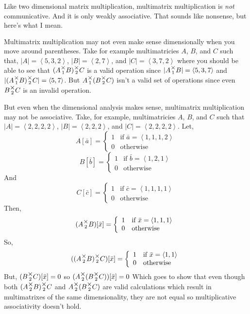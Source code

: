 \documentclass[12pt]{article}
\theoremstyle{definition}
\theoremstyle{case}
\theoremstyle{ppart}
\newcommand{\mmult}[1]{\text{\raisebox{1ex}{$\underset{#1}{\times}$}}}
\begin{document}
Like two dimensional matrix multiplication, multimatrix multiplication is
\textit{not} communicative. And it is only weakly associative. That sounds like
nonsense, but here's what I mean.

Multimatrix multiplication may not even make sense dimensionally when you move
around parentheses. Take for example multimatricies $A$, $B$, and $C$ such that,
$|A| = \left<5,3,2\right>$,
$|B| = \left<2,7\right>$, and
$|C| = \left<3,7,2\right>$ where you should be able to see that
$(A \mmult{1} B) \mmult{2} C$ is a valid operation since
$|A \mmult{1} B| = \left<5,3,7\right>$ and
$|(A \mmult{1} B) \mmult{2} C| = \left<5,7\right>$. But
$A \mmult{1} (B \mmult{2} C)$ isn't a valid set of operations since even
$B \mmult{2} C$ is an invalid operation.

But even when the dimensional analysis makes sense, multimatrix multiplication
may not be associative. Take, for example, multimatricies $A$, $B$, and $C$ such
that $|A| = \left<2,2,2,2\right>$, $|B| = \left<2,2,2\right>$, and
$|C| = \left<2,2,2,2\right>$. Let,
\[
 A[\bar{a}] = 
	\left\{
		\begin{array}{ll}
			1 & \mbox{if } \bar{a} = \left<1,1,1,2\right> \\
			0 & \mbox{otherwise}
		\end{array}
	\right.
\]
\[
 B[\bar{b}] = 
	\left\{
		\begin{array}{ll}
			1 & \mbox{if } \bar{b} = \left<1,2,1\right> \\
			0 & \mbox{otherwise}
		\end{array}
	\right.
\]
And
\[
 C[\bar{c}] = 
	\left\{
		\begin{array}{ll}
			1 & \mbox{if } \bar{c} = \left<1,1,1,1\right> \\
			0 & \mbox{otherwise}
		\end{array}
	\right.
\]
Then,
\[
 (A \mmult{2} B)[\bar{x}] = 
	\left\{
		\begin{array}{ll}
			1 & \mbox{if } \bar{x} = \left<1,1,1\right> \\
			0 & \mbox{otherwise}
		\end{array}
	\right.
\]
So,
\[
 ((A \mmult{2} B) \mmult{2} C)[\bar{x}] = 
	\left\{
		\begin{array}{ll}
			1 & \mbox{if } \bar{x} = \left<1,1\right> \\
			0 & \mbox{otherwise}
		\end{array}
	\right.
\]
But, $(B \mmult{2} C)[\bar{x}] = 0$ so $(A \mmult{2} (B \mmult{2} C))[\bar{x}] = 0$
Which goes to show that even though both $(A \mmult{2} B) \mmult{2} C$ and
$A \mmult{2} (B \mmult{2} C)$ are valid calculations which result in multimatrixes
of the same dimensionality, they are not equal so multiplicative associativity
doesn't hold.
\end{document}

